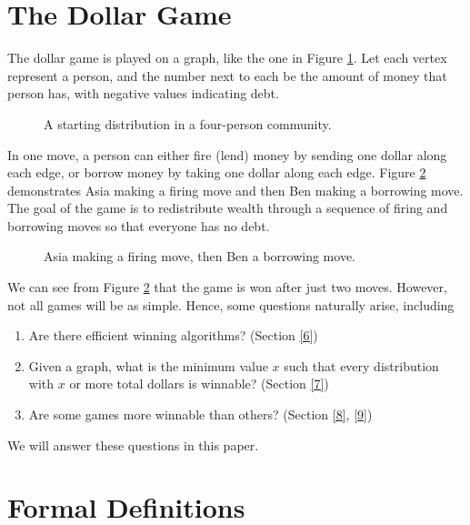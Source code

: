 \documentclass[openany, amssymb, psamsfonts]{amsart}
\theoremstyle{definition}
\numberwithin{equation}{section}
\begin{document}
\section{The Dollar Game}
\label{2}

The dollar game is played on a graph, like the one in Figure \ref{fig 2.1}. Let each vertex represent a person, and the number next to each be the amount of money that person has, with negative values indicating debt.

\begin{figure}[ht]
    \centering
    
    \caption{A starting distribution in a four-person community.}
    \label{fig 2.1}
\end{figure}

In one move, a person can either fire (lend) money by sending one dollar along each edge, or borrow money by taking one dollar along each edge. Figure \ref{fig 2.2} demonstrates Asia making a firing move and then Ben making a borrowing move. The goal of the game is to redistribute wealth through a sequence of firing and borrowing moves so that everyone has no debt. 

\begin{figure}[ht]
    \centering
    
    \caption{Asia making a firing move, then Ben a borrowing move.}
    \label{fig 2.2}
\end{figure}

We can see from Figure \ref{fig 2.2} that the game is won after just two moves. However, not all games will be as simple. Hence, some questions naturally arise, including
\begin{enumerate}
    \item Are there efficient winning algorithms? (Section \ref{6})
    \label{question 1}
    \item Given a graph, what is the minimum value $x$ such that every distribution with $x$ or more total dollars is winnable? (Section \ref{7})
    \label{question 2}
    \item Are some games more winnable than others? (Section \ref{8}, \ref{9})
    \label{question 3}
\end{enumerate}
We will answer these questions in this paper.





\section{Formal Definitions}
\label{3}
\end{document}
